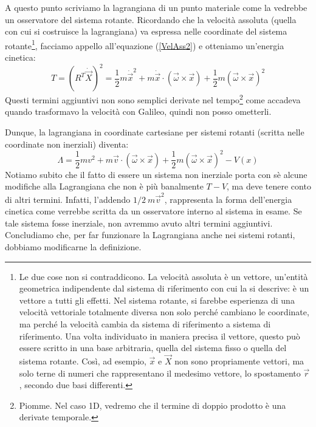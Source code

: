 \documentclass[a4paper,openany]{article}
\begin{document}
	A questo punto scriviamo la lagrangiana di un punto materiale come la vedrebbe un osservatore del sistema rotante. Ricordando che la velocità assoluta (quella con cui si costruisce la lagrangiana) va espressa nelle coordinate del sistema rotante\footnote{Le due cose non si contraddicono. La velocità assoluta è un vettore, un'entità geometrica indipendente dal sistema di riferimento con cui la si descrive: è un vettore a tutti gli effetti. Nel sistema rotante, si farebbe esperienza di una velocità vettoriale totalmente diversa non solo perché cambiano le coordinate, ma perché la velocità cambia da sistema di riferimento a sistema di riferimento. Una volta individuato in maniera precisa il vettore, questo può essere scritto in una base arbitraria, quella del sistema fisso o quella del sistema rotante. Così, ad esempio, $\vec{x}$ e $\vec{X}$ non sono propriamente vettori, ma solo terne di numeri che rappresentano il medesimo vettore, lo spostamento $\vec{r}$, secondo due basi differenti.}, facciamo appello all'equazione (\ref{VelAss2}) e otteniamo un'energia cinetica:
	\begin{equation}
		T = (R^{T}\dot{\vec{X}})^2 = \dfrac{1}{2}m\dot{\vec{x}}^{2} + m\dot{\vec{x}}\cdot(\vec{\omega}\times\vec{x})+ \dfrac{1}{2}m (\vec{\omega}\times\vec{x})^{2}
	\end{equation}
Questi termini aggiuntivi non sono semplici derivate nel tempo\footnote{Piomme. Nel caso 1D, vedremo che il termine di doppio prodotto è una derivate temporale.} come accadeva quando trasformavo la velocità con Galileo, quindi non posso ometterli.

	Dunque, la lagrangiana in coordinate cartesiane per sistemi rotanti (scritta nelle coordinate non inerziali) diventa:
	\begin{equation}
		\Lambda = \dfrac{1}{2}mv^{2} + m\vec{v}\cdot(\vec{\omega}\times\vec{x}) + \dfrac{1}{2}m(\vec{\omega}\times\vec{x})^{2} - V(x)
		\label{LagRot}
	\end{equation}
	Notiamo subito che il fatto di essere un sistema non inerziale porta con sè alcune modifiche alla Lagrangiana che non è più banalmente $T-V$, ma deve tenere conto di altri termini. Infatti, l'addendo $1/2\> m\vec{v}^{2}$, rappresenta la forma dell'energia cinetica come verrebbe scritta da un osservatore interno al sistema in esame. Se tale sistema fosse inerziale, non avremmo avuto altri termini aggiuntivi. Concludiamo che, per far funzionare la Lagrangiana anche nei sistemi rotanti, dobbiamo modificarne la definizione.
\end{document}

